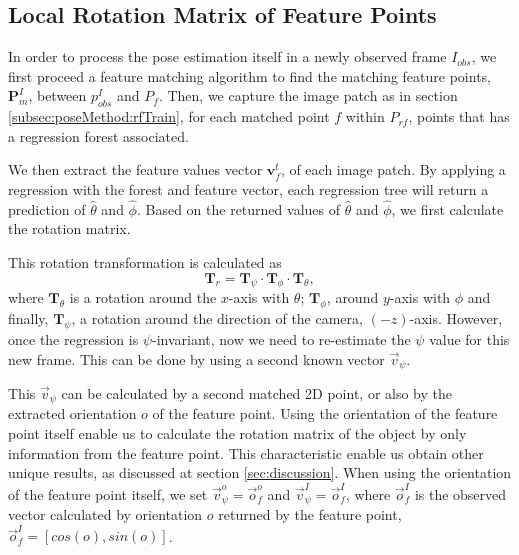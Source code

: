 \documentclass[annual]{acmsiggraph}
\begin{document}


\subsection{Local Rotation Matrix of Feature Points}
\label{subsec:poseMethod:rotMat}

In order to process the pose estimation itself in a newly observed frame $I_{obs}$, we first proceed a feature matching algorithm to find the matching feature points, $\mathbf{P}^I_{m}$, between $p^I_{obs}$ and $P_{f}$. Then, we capture the image patch as in section \ref{subsec:poseMethod:rfTrain}, for each matched point $f$ within $P_{rf}$, points that has a regression forest associated. 


We then extract the feature values vector $\mathbf{v}^{t}_{f}$, of each image patch. By applying a regression with the forest and feature vector, each regression tree will return a prediction of $\hat{\theta}$ and $\hat{\phi}$. Based on the returned values of $\hat{\theta}$ and $\hat{\phi}$, we first calculate the rotation matrix. 

This rotation transformation is calculated as 
\begin{equation}
\mathbf{T}_{r} = \mathbf{T}_{\psi}\cdot\mathbf{T}_{\phi}\cdot \mathbf{T}_{\theta}, 
\label{eq:rotTrans}
\end{equation}
where $\mathbf{T}_{\theta}$ is a rotation around the $x$-axis with $\theta$; $\mathbf{T}_{\phi}$, around $y$-axis with $\phi$ and finally, $\mathbf{T}_{\psi}$, a rotation around the direction of the camera, $(-z)$-axis. However, once the regression is $\psi$-invariant, now we need to re-estimate the $\psi$ value for this new frame. This can be done by using a second known vector $\vec{v}_{\psi}$. 

This $\vec{v}_{\psi}$ can be calculated by a second matched 2D point, or also by the extracted orientation $o$ of the feature point. Using the orientation of the feature point itself enable us to calculate the rotation matrix of the object by only information from the feature point. This characteristic enable us obtain other unique results, as discussed at section \ref{sec:discussion}. When using the orientation of the feature point itself, we set $\vec{v}_{\psi}^o = \vec{o}_{f}^o$ and $\vec{v}_{\psi}^I = \vec{o}_{f}^I$, where $\vec{o}_{f}^I$ is the observed vector calculated by orientation $o$ returned by the feature point, $\vec{o}_{f}^I = [cos(o), sin(o)]$.  
\end{document}
